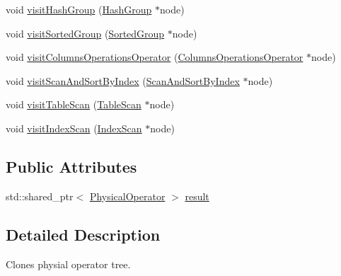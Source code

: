 \begin{DoxyCompactItemize}
\item 
void \hyperlink{classrafe_1_1_cloning_physical_operator_visitor_a489a807271ce26529d48cefea1aa31a2}{visit\+Hash\+Group} (\hyperlink{classrafe_1_1_hash_group}{Hash\+Group} $\ast$node)
\item 
void \hyperlink{classrafe_1_1_cloning_physical_operator_visitor_a5eeb41c81760f9598b11e18ba26949f6}{visit\+Sorted\+Group} (\hyperlink{classrafe_1_1_sorted_group}{Sorted\+Group} $\ast$node)
\item 
void \hyperlink{classrafe_1_1_cloning_physical_operator_visitor_aac8214c9491fac739850b004bad92815}{visit\+Columns\+Operations\+Operator} (\hyperlink{classrafe_1_1_columns_operations_operator}{Columns\+Operations\+Operator} $\ast$node)
\item 
void \hyperlink{classrafe_1_1_cloning_physical_operator_visitor_a61e925129b55230d187280a9a6d76d37}{visit\+Scan\+And\+Sort\+By\+Index} (\hyperlink{classrafe_1_1_scan_and_sort_by_index}{Scan\+And\+Sort\+By\+Index} $\ast$node)
\item 
void \hyperlink{classrafe_1_1_cloning_physical_operator_visitor_a5515f4184243db8a585276d1cb58a8c2}{visit\+Table\+Scan} (\hyperlink{classrafe_1_1_table_scan}{Table\+Scan} $\ast$node)
\item 
void \hyperlink{classrafe_1_1_cloning_physical_operator_visitor_a43fa4aac2e3adfd4b1dc2280a1cfe165}{visit\+Index\+Scan} (\hyperlink{classrafe_1_1_index_scan}{Index\+Scan} $\ast$node)
\end{DoxyCompactItemize}
\subsection*{Public Attributes}
\begin{DoxyCompactItemize}
\item 
std\+::shared\+\_\+ptr$<$ \hyperlink{classrafe_1_1_physical_operator}{Physical\+Operator} $>$ \hyperlink{classrafe_1_1_cloning_physical_operator_visitor_a86bb79f74c796959168c69eeb1d35dea}{result}
\end{DoxyCompactItemize}


\subsection{Detailed Description}
Clones physial operator tree. 

